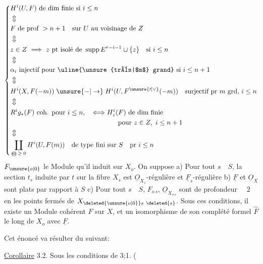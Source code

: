 \[
\left\{\begin{aligned}
&H^i(U,F)\text{ de dim finie si }i\leq n\\
&\Updownarrow\\
&F\text{ de prof }>n+1\quad\text{sur }U\text{ au voisinage de }Z\\
&\Updownarrow\\
&z\in Z\ \Longrightarrow\ z\text{ pt isolé de }\operatorname{supp}E^{r-i-1}\cup\{z\}\quad\text{si }i\leq n\\
&\Updownarrow\\
&\alpha_i\text{ injectif pour \uline{\unsure{très|$m$} grand} si }i\leq n+1\\
&\Updownarrow\\
&H^i(X,F(-m))\mathrel{\unsure{-|\to}}H^i(U,F^{\unsure{\prime|\vee}}(-m))\quad\text{surjectif pr }m\text{ grd, }i\leq n\\
&\Updownarrow\\
&R^ig_*(F)\text{ coh. pour }i\leq n,\quad\Longleftrightarrow H^i_z(F)\text{ de dim finie}\\
&\hspace{16em}\text{pour }z\in Z,\ i\leq n+1\\
&\Updownarrow\\
&\coprod_{\text{\textcircled{\scriptsize $m\geq0$}}}H^i(U,F(m))\quad\text{de type fini sur }S\quad\text{pr }i\leq n
\end{aligned}\right.
\]
$F_{\unsure{o|0}}$ le Module qu'il induit sur $X_o$. On suppose \quad a) Pour tout $s\quad S$, la section $t_s$ induite par $t$ sur la fibre $X_s$ est $\underline O_{X_s}$-régulière et $\underline F_s$-régulière \quad b) $\underline F$ et $\underline O_X$ sont plats par rapport à $S$ \quad c) Pour tout $s\quad S$, $F_{o\ s}$,  $\underline O_{X_{o\ s}}$  sont de profondeur $\quad2$ en les points fermés de $X_{\deleted{\unsure{o|0}}s\ \deleted{s}}$. Sous ces conditions, il existe un Module cohérent $F$ sur $X$, et un isomorphisme de son complété formel $\widehat F$ le long de $X_o$ avec $\underline F$.

Cet énoncé va résulter du suivant:

\uline{Corollaire} 3.2. \quad Sous les conditions de 3;1. \quad (

